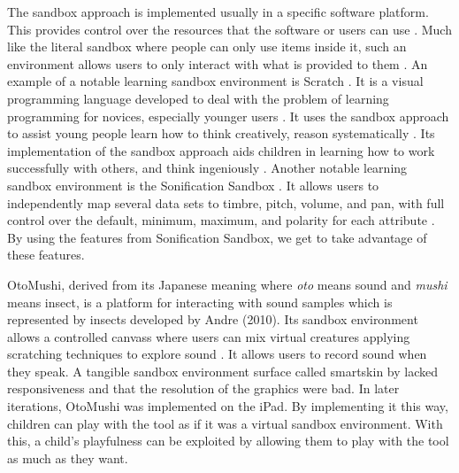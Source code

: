 The sandbox approach is implemented usually in a specific software platform. This provides control over the resources that the software or users can use \cite{prevelakis2001sandboxing}. Much like the literal sandbox where people can only use items inside it, such an environment allows users to only interact with what is provided to them \cite{goldberg1996secure}. An example of a notable learning sandbox environment is Scratch
. It is a visual programming language developed to deal with the problem of learning programming for novices, especially younger users \cite{maloney2010scratch}. It uses the sandbox approach to assist young people learn how to think creatively, reason systematically \cite{kaleliouglu2014effects}.
Its implementation of the sandbox approach aids children in learning how to work successfully with others, and think ingeniously \cite{nodalo2019building}. Another notable learning sandbox environment is the Sonification Sandbox \cite{walker2003sonification}. It allows users to independently map several data sets to timbre, pitch, volume, and pan, with full control over the default, minimum, maximum, and polarity for each attribute \cite{walker2003sonification}. By using the features from Sonification Sandbox, we get to take advantage of these features.


OtoMushi, derived from its Japanese meaning where \textit{oto} means sound and \textit{mushi} means insect, is a platform for interacting with sound samples which is represented by insects developed by Andre (2010). Its sandbox environment allows a controlled canvass where users can mix virtual creatures applying scratching techniques to explore sound \cite{andre2010otomushi}. It allows users to record sound when they speak. A tangible sandbox environment surface called smartskin by \cite{rekimoto2002smartskin} lacked responsiveness and that the resolution of the graphics were bad. In later iterations, OtoMushi was implemented on the iPad. By implementing it this way, children can play with the tool as if it was a virtual sandbox environment. With this, a child's playfulness can be exploited by allowing them to play with the tool as much as they want.

